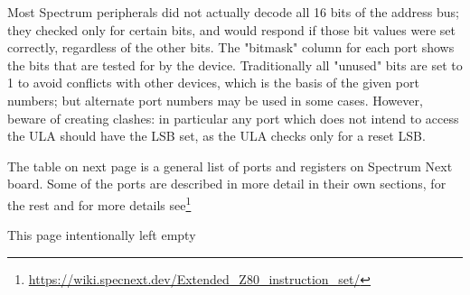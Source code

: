 \documentclass[12pt,twoside,openright,a4paper]{book}
\newcommand{\intentiallyempty}{
	\mbox{}
	\vfill
	\begin{center}
	This page intentionally left empty
	\end{center}
	\vfill
	\mbox{}
}
\begin{document}
Most Spectrum peripherals did not actually decode all 16 bits of the address bus; they checked only for certain bits, and would respond if those bit values were set correctly, regardless of the other bits. The "bitmask" column for each port shows the bits that are tested for by the device. Traditionally all "unused" bits are set to 1 to avoid conflicts with other devices, which is the basis of the given port numbers; but alternate port numbers may be used in some cases. However, beware of creating clashes: in particular any port which does not intend to access the ULA should have the LSB set, as the ULA checks only for a reset LSB.

The table on next page is a general list of ports and registers on Spectrum Next board. Some of the ports are described in more detail in their own sections, for the rest and for more details see\footnote{
\url{https://wiki.specnext.dev/Extended_Z80_instruction_set/}}


\pagebreak
\intentiallyempty
\pagebreak
\end{document}
